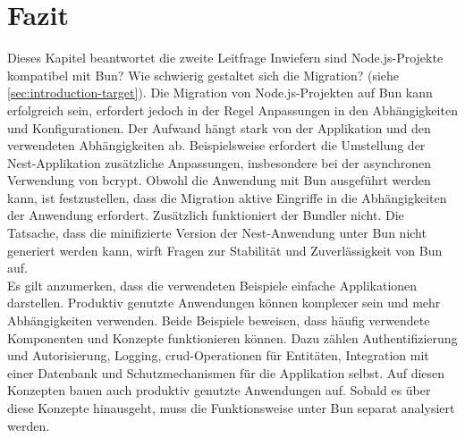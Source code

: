 \section{Fazit} \label{sec:compabitility-conclusion}
Dieses Kapitel beantwortet die zweite Leitfrage \glqq Inwiefern sind Node.js-Projekte kompatibel mit Bun? Wie schwierig gestaltet sich die Migration?\grqq{} (siehe \autoref{sec:introduction-target}). Die Migration von Node.js-Projekten auf Bun kann erfolgreich sein, erfordert jedoch in der Regel Anpassungen in den Abhängigkeiten und Konfigurationen. Der Aufwand hängt stark von der Applikation und den verwendeten Abhängigkeiten ab. Beispielsweise erfordert die Umstellung der Nest-Applikation zusätzliche Anpassungen, insbesondere bei der asynchronen Verwendung von \glq bcrypt\grq{}. Obwohl die Anwendung mit Bun ausgeführt werden kann, ist festzustellen, dass die Migration aktive Eingriffe in die Abhängigkeiten der Anwendung erfordert. Zusätzlich funktioniert der Bundler nicht. Die Tatsache, dass die minifizierte Version der Nest-Anwendung unter Bun nicht generiert werden kann, wirft Fragen zur Stabilität und Zuverlässigkeit von Bun auf.\\

\noindent
Es gilt anzumerken, dass die verwendeten Beispiele einfache Applikationen darstellen. Produktiv genutzte Anwendungen können komplexer sein und mehr Abhängigkeiten verwenden. Beide Beispiele beweisen, dass häufig verwendete Komponenten und Konzepte funktionieren können. Dazu zählen Authentifizierung und Autorisierung, Logging, \ac{crud}-Operationen für Entitäten, Integration mit einer Datenbank und Schutzmechanismen für die Applikation selbst. Auf diesen Konzepten bauen auch produktiv genutzte Anwendungen auf. Sobald es über diese Konzepte hinausgeht, muss die Funktionsweise unter Bun separat analysiert werden.
